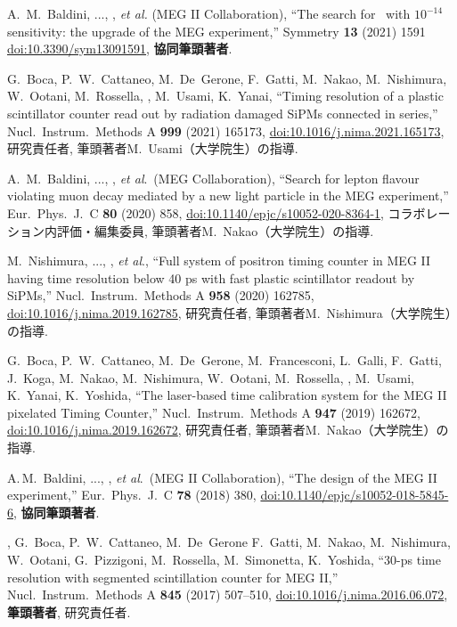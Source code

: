 \begin{enumerate}
A.~M.~Baldini, ..., \me, {\it et al.} (MEG II Collaboration),
``The search for \megc\ with $10^{-14}$ sensitivity: the upgrade of the MEG experiment,''
Symmetry {\bf 13} (2021) 1591
\href{https://doi.org/10.3390/sym13091591}{doi:10.3390/sym13091591}, 
\textbf{協同筆頭著者}.

G.~Boca, P.~W.~Cattaneo, M.~De~Gerone, F.~Gatti, M.~Nakao, M.~Nishimura, W.~Ootani, M.~Rossella, \me, M.~Usami, K.~Yanai, ``Timing resolution of a plastic scintillator counter read out by radiation damaged SiPMs connected in series,'' Nucl.\ Instrum.\ Methods A {\bf 999} (2021) 165173,
\href{https://doi.org/10.1016/j.nima.2021.165173}{doi:10.1016/j.nima.2021.165173},
研究責任者, 筆頭著者M.~Usami（大学院生）の指導.

A.~M.~Baldini, ..., \me, {\it et al}.\ (MEG Collaboration),
``Search for lepton flavour violating muon decay mediated by a new light particle in the MEG experiment,'' Eur.\ Phys.\ J.\ C \textbf{80} (2020) 858,
\href{https://doi.org/10.1140/epjc/s10052-020-8364-1}{doi:10.1140/epjc/s10052-020-8364-1},
コラボレーション内評価・編集委員,  筆頭著者M.~Nakao（大学院生）の指導.

M.~Nishimura, ..., \me, {\it et al}., 
``Full system of positron timing counter in MEG II having time resolution below 40 ps with fast plastic scintillator readout by SiPMs,''
Nucl.\ Instrum.\ Methods A \textbf{958} (2020) 162785,
\href{https://doi.org/10.1016/j.nima.2019.162785}{doi:10.1016/j.nima.2019.162785},
研究責任者,  筆頭著者M.~Nishimura（大学院生）の指導.

  G.~Boca, P.~W.~Cattaneo, M.~De~Gerone, M.~Francesconi, L.~Galli, F.~Gatti, J.~Koga,
  M.~Nakao, M.~Nishimura, W.~Ootani, M.~Rossella, \me, M.~Usami, K.~Yanai, K.~Yoshida,
  ``The laser-based time calibration system for the MEG II pixelated Timing Counter,''
  Nucl.\ Instrum.\ Methods A {\bf 947}  (2019) 162672,
  \href{https://doi.org/10.1016/j.nima.2019.162672}{doi:10.1016/j.nima.2019.162672},
  研究責任者,  筆頭著者M.~Nakao（大学院生）の指導.
	 
A.\,M.~Baldini, ..., \me, {\it et al}.\ (MEG II Collaboration),
  ``The design of the MEG II experiment,''
  Eur.\ Phys.\ J.\ C {\bf 78}  (2018) 380,
  \href{https://doi.org/10.1140/epjc/s10052-018-5845-6}{doi:10.1140/epjc/s10052-018-5845-6},
  \textbf{協同筆頭著者}.

  \me, G.~Boca, P.~W.~Cattaneo, M.~De~Gerone F.~Gatti, M.~Nakao, M.~Nishimura, W.~Ootani, G.~Pizzigoni, M.~Rossella, M.~Simonetta, K.~Yoshida, 
  ``30-ps time resolution with segmented scintillation counter for MEG II,''
  Nucl.\ Instrum.\ Methods A {\bf 845} (2017) 507--510,
  \href{https://doi.org/10.1016/j.nima.2016.06.072}{doi:10.1016/j.nima.2016.06.072},
  \textbf{筆頭著者}, 研究責任者.


\end{enumerate}
